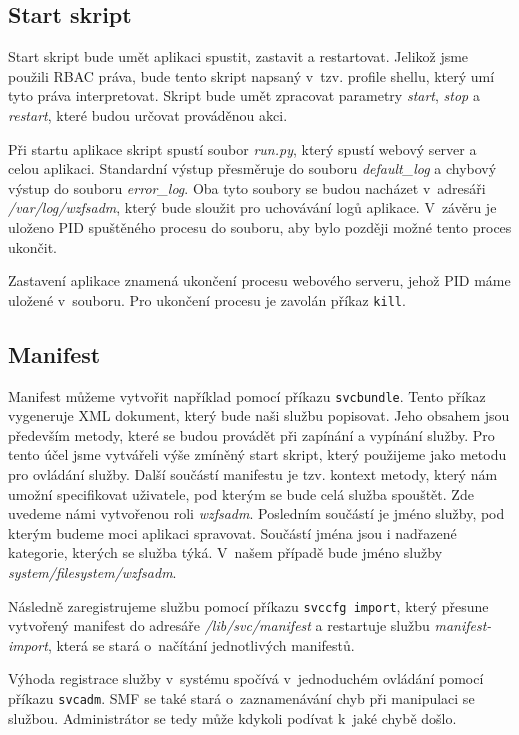 \subsection{Start skript}
Start skript bude umět aplikaci spustit, zastavit a restartovat. Jelikož jsme použili RBAC práva, bude tento skript napsaný v~tzv. profile shellu, který umí tyto práva interpretovat. Skript bude umět zpracovat parametry \emph{start}, \emph{stop} a \emph{restart}, které budou určovat prováděnou akci.

Při startu aplikace skript spustí soubor \emph{run.py}, který spustí webový server a celou aplikaci. Standardní výstup přesměruje do souboru \emph{default\_log} a chybový výstup do souboru \emph{error\_log}. Oba tyto soubory se budou nacházet v~adresáři \emph{/var/log/wzfsadm}, který bude sloužit pro uchovávání logů aplikace. V~závěru je uloženo PID spuštěného procesu do souboru, aby bylo později možné tento proces ukončit.

Zastavení aplikace znamená ukončení procesu webového serveru, jehož PID máme uložené v~souboru. Pro ukončení procesu je zavolán příkaz \verb|kill|.
\subsection{Manifest}
Manifest můžeme vytvořit například pomocí příkazu \verb|svcbundle|. Tento příkaz vygeneruje XML dokument, který bude naši službu popisovat. Jeho obsahem jsou především metody, které se budou provádět při zapínání a vypínání služby. Pro tento účel jsme vytvářeli výše zmíněný start skript, který použijeme jako metodu pro ovládání služby. Další součástí manifestu je tzv. kontext metody, který nám umožní specifikovat uživatele, pod kterým se bude celá služba spouštět. Zde uvedeme námi vytvořenou roli \emph{wzfsadm}. Posledním součástí je jméno služby, pod kterým budeme moci aplikaci spravovat. Součástí jména jsou i nadřazené kategorie, kterých se služba týká. V~našem případě bude jméno služby \emph{system/\-filesystem/\-wzfsadm}.

Následně zaregistrujeme službu pomocí příkazu \verb|svccfg import|, který přesune vytvořený manifest do adresáře \emph{/lib/\-svc/\-manifest} a restartuje službu \emph{manifest-import}, která se stará o~načítání jednotlivých manifestů.

Výhoda registrace služby v~systému spočívá v~jednoduchém ovládání pomocí příkazu \verb|svcadm|. SMF se také stará o~zaznamenávání chyb při manipulaci se službou. Administrátor se tedy může kdykoli podívat k~jaké chybě došlo.
